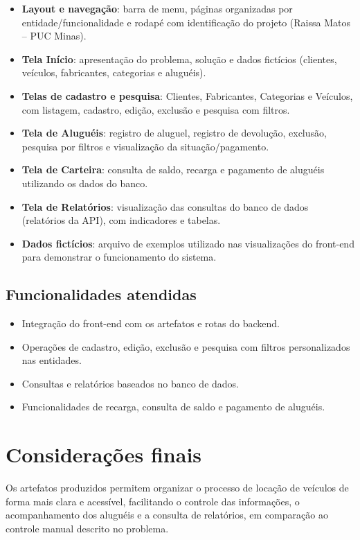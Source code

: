 \documentclass[12pt,a4paper]{article}
\begin{document}
\begin{itemize}[leftmargin=*]
    \item \textbf{Layout e navegação}: barra de menu, páginas organizadas por entidade/funcionalidade e rodapé com identificação do projeto (Raissa Matos -- PUC Minas).
    \item \textbf{Tela Início}: apresentação do problema, solução e dados fictícios (clientes, veículos, fabricantes, categorias e aluguéis).
    \item \textbf{Telas de cadastro e pesquisa}: Clientes, Fabricantes, Categorias e Veículos, com listagem, cadastro, edição, exclusão e pesquisa com filtros.
    \item \textbf{Tela de Aluguéis}: registro de aluguel, registro de devolução, exclusão, pesquisa por filtros e visualização da situação/pagamento.
    \item \textbf{Tela de Carteira}: consulta de saldo, recarga e pagamento de aluguéis utilizando os dados do banco.
    \item \textbf{Tela de Relatórios}: visualização das consultas do banco de dados (relatórios da API), com indicadores e tabelas.
    \item \textbf{Dados fictícios}: arquivo de exemplos utilizado nas visualizações do front-end para demonstrar o funcionamento do sistema.
\end{itemize}

\subsection{Funcionalidades atendidas}
\begin{itemize}[leftmargin=*]
    \item Integração do front-end com os artefatos e rotas do backend.
    \item Operações de cadastro, edição, exclusão e pesquisa com filtros personalizados nas entidades.
    \item Consultas e relatórios baseados no banco de dados.
    \item Funcionalidades de recarga, consulta de saldo e pagamento de aluguéis.
\end{itemize}

\section{Considerações finais}
Os artefatos produzidos permitem organizar o processo de locação de veículos de forma mais clara e acessível, facilitando o controle das informações, o acompanhamento dos aluguéis e a consulta de relatórios, em comparação ao controle manual descrito no problema.
\end{document}
